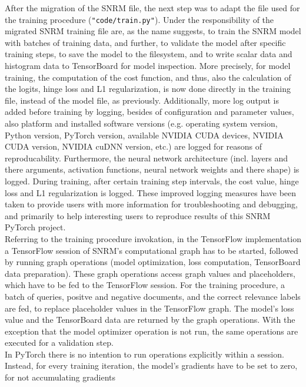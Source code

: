 After the migration of the SNRM file, the next step was to adapt the file used for the 
    training procedure (\texttt{"code/train.py"}).
Under the responsibility of the migrated SNRM training file are, as the name suggests,
    to train the SNRM model with batches of training data,
    and further, to validate the model after specific training steps,
    to save the model to the filesystem, and
    to write scalar data and histogram data to TensorBoard for model inspection.
More precisely, for model training, the computation of the cost function, and thus,
    also the calculation of the logits, hinge loss and L1 regularization, is now done
    directly in the training file, instead of the model file, as previously.
Additionally, more log output is added before training by logging, besides of configuration and parameter
    values, also platform and installed software versions 
    (e.g. operating system version, Python version, PyTorch version, available NVIDIA CUDA devices, 
    NVIDIA CUDA version, NVIDIA cuDNN version, etc.)
    are logged for reasons of reproducability.
Furthermore, the neural network architecture (incl. layers and there arguments, activation functions, 
    neural network weights and there shape) is logged.
During training, after certain training step intervals, the cost value, hinge loss and 
    L1 regularization is logged.
These improved logging measures have been taken to provide users with more information for 
    troubleshooting and debugging, and primarily to help interesting users to reproduce 
    results of this SNRM PyTorch project.\\
Referring to the training procedure invokation, in the TensorFlow implementation 
    a TensorFlow session of SNRM's computational graph has to be started, 
    followed by running graph operations (model optimization, loss computation, TensorBoard data preparation).
These graph operations access graph values and placeholders, which have to be fed to the
    TensorFlow session.
For the training procedure, a batch of queries, positve and negative documents, and the correct 
    relevance labels are fed, to replace placeholder values in the TensorFlow graph.
The model's loss value and the TensorBoard data are returned by the graph operations.
With the exception that the model optimizer operation is not run, the same operations 
    are executed for a validation step.\\
In PyTorch there is no intention to run operations explicitly within a session.
Instead, for every training iteration, the model's gradients have to be set to zero, for not accumulating gradients
